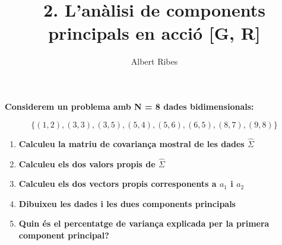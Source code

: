 \documentclass[a4paper,10pt]{article}
\title{2. L'anàlisi de components principals en acció [G, R]}
\author{Albert Ribes}
\begin{document}
\maketitle

%


\textbf{
Considerem un problema amb N = 8 dades bidimensionals:
}

\begin{equation*}
  \{(1, 2), (3, 3), (3, 5), (5, 4), (5, 6), (6, 5), (8, 7), (9, 8)\}
\end{equation*}

\begin{enumerate}
  \item \textbf{Calculeu la matriu de covariança mostral de les dades $\hat{\Sigma}$}



  \item \textbf{Calculeu els dos valors propis de $\hat{\Sigma}$}





  \item \textbf{Calculeu els dos vectors propis corresponents a $a_1$ i $a_2$}

  \item \textbf{Dibuixeu les dades i les dues components principals}

  \item \textbf{Quin és el percentatge de variança explicada per la primera component principal?}
\end{enumerate}
\end{document}
